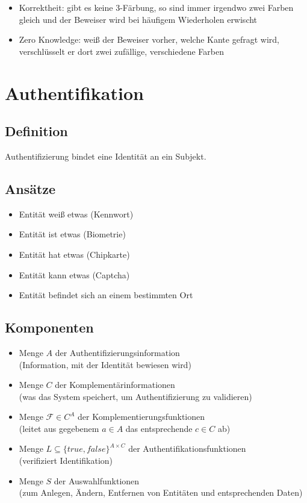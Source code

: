 \documentclass[a4paper,twoside,DIV15,BCOR12mm]{scrbook}
\begin{document}
\begin{itemize}
	\item Korrektheit: gibt es keine 3-Färbung, so sind immer irgendwo zwei Farben gleich und der Beweiser wird bei häufigem Wiederholen erwischt
	\item Zero Knowledge: weiß der Beweiser vorher, welche Kante gefragt wird, verschlüsselt er dort zwei zufällige, verschiedene Farben
\end{itemize}


\chapter{Authentifikation}

\section{Definition}

Authentifizierung bindet eine Identität an ein Subjekt.

\section{Ansätze}

\begin{itemize}
	\item Entität weiß etwas (Kennwort)
	\item Entität ist etwas (Biometrie)
	\item Entität hat etwas (Chipkarte)
	\item Entität kann etwas (Captcha)
	\item Entität befindet sich an einem bestimmten Ort
\end{itemize}

\section{Komponenten}

\begin{itemize}
	\item Menge $A$ der Authentifizierungsinformation\\ (Information, mit der Identität bewiesen wird)
	\item Menge $C$ der Komplementärinformationen\\ (was das System speichert, um Authentifizierung zu validieren)
	\item Menge $\mathcal{F} \in C^A$ der Komplementierungsfunktionen\\ (leitet aus gegebenem $a \in A$ das entsprechende $c \in C$ ab)
	\item Menge $L \subseteq {\{ true, false \}}^{A \times C}$ der Authentifikationsfunktionen\\ (verifiziert Identifikation)
	\item Menge $S$ der Auswahlfunktionen\\ (zum Anlegen, Ändern, Entfernen von Entitäten und entsprechenden Daten)
\end{itemize}
\end{document}
